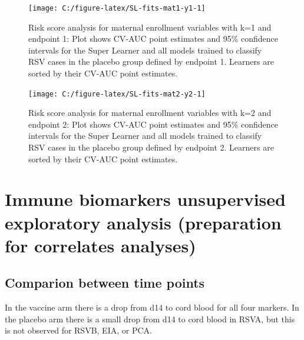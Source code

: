 \documentclass[11pt]{article}
\begin{document}
\begin{figure}[H]

{\centering \texttt{[image: C:/figure-latex/SL-fits-mat1-y1-1]} 

}

\caption[Risk score analysis for maternal enrollment variables with k=1 and endpoint 1.]{\label{fig:riskscoreEndpoint1}Risk score analysis for maternal enrollment variables with k=1 and endpoint 1: Plot shows CV-AUC point estimates and 95\% confidence intervals for the Super Learner and all models trained to classify RSV cases in the placebo group defined by endpoint 1. Learners are sorted by their CV-AUC point estimates.}\label{fig:SL-fits-mat1-y1}
\end{figure}

\begin{figure}[H]

{\centering \texttt{[image: C:/figure-latex/SL-fits-mat2-y2-1]} 

}

\caption[Risk score analysis for maternal enrollment variables with k=2 and endpoint 2.]{\label{fig:riskscoreEndpoint2}Risk score analysis for maternal enrollment variables with k=2 and endpoint 2: Plot shows CV-AUC point estimates and 95\% confidence intervals for the Super Learner and all models trained to classify RSV cases in the placebo group defined by endpoint 2. Learners are sorted by their CV-AUC point estimates.}\label{fig:SL-fits-mat2-y2}
\end{figure}

\clearpage

\hypertarget{immune-biomarkers-unsupervised-exploratory-analysis-preparation-for-correlates-analyses}{%
\section{Immune biomarkers unsupervised exploratory analysis (preparation for correlates analyses)}\label{immune-biomarkers-unsupervised-exploratory-analysis-preparation-for-correlates-analyses}}

\hypertarget{comparion-between-time-points}{%
\subsection{Comparion between time points}\label{comparion-between-time-points}}

In the vaccine arm there is a drop from d14 to cord blood for all four markers.
In the placebo arm there is a small drop from d14 to cord blood in RSVA, but this is not observed for RSVB, EIA, or PCA.
\end{document}
